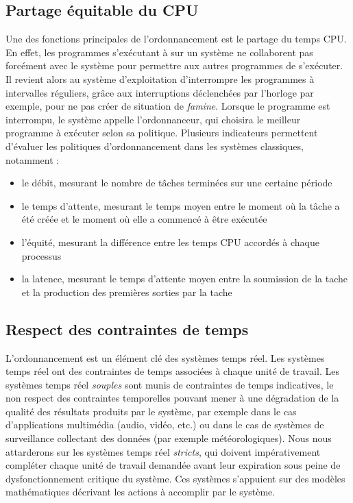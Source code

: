 			\subsection{Partage équitable du CPU}
		Une des fonctions principales de l'ordonnancement est le partage du temps CPU. En effet, les programmes s'exécutant à sur un système ne collaborent pas forcément avec le système pour permettre aux autres programmes de s'exécuter. Il revient alors au système d'exploitation d'interrompre les programmes à intervalles réguliers, grâce aux interruptions déclenchées par l'horloge par exemple, pour ne pas créer de situation de \emph{famine}. Lorsque le programme est interrompu, le système appelle l'ordonnanceur, qui choisira le meilleur programme à exécuter selon sa politique.
		Plusieurs indicateurs permettent d'évaluer les politiques d'ordonnancement dans les systèmes classiques, notamment :
		\begin{itemize}
			\item{le débit, mesurant le nombre de tâches terminées sur une certaine période}
			\item{le temps d'attente, mesurant le temps moyen entre le moment où la tâche a été créée et le moment où elle a commencé à être exécutée}
			\item{l'équité, mesurant la différence entre les temps CPU accordés à chaque processus}
			\item{la latence, mesurant le temps d'attente moyen entre la soumission de la tache et la production des premières sorties par la tache}
		\end{itemize}

			\subsection{Respect des contraintes de temps}

		L'ordonnancement est un élément clé des systèmes temps réel. Les systèmes temps réel ont des contraintes de temps associées à chaque unité de travail. Les systèmes temps réel \emph{souples} sont munis de contraintes de temps indicatives, le non respect des contraintes temporelles pouvant mener à une dégradation de la qualité des résultats produits par le système, par exemple dans le cas d'applications multimédia (audio, vidéo, etc.) ou dans le cas de systèmes de surveillance collectant des données (par exemple météorologiques). Nous nous attarderons sur les systèmes temps réel \emph{stricts}, qui doivent impérativement compléter chaque unité de travail demandée avant leur expiration sous peine de dysfonctionnement critique du système. Ces systèmes s'appuient sur des modèles mathématiques décrivant les actions à accomplir par le système.

